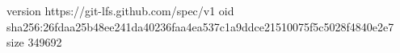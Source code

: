 version https://git-lfs.github.com/spec/v1
oid sha256:26fdaa25b48ee241da40236faa4ea537c1a9ddce21510075f5c5028f4840e2e7
size 349692
